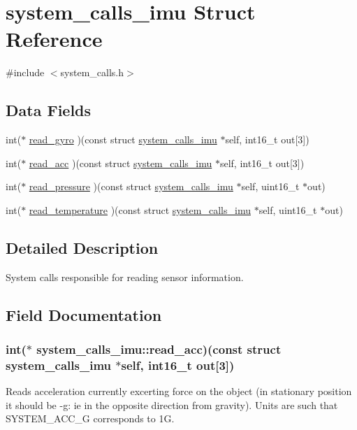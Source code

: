 \hypertarget{structsystem__calls__imu}{\section{system\+\_\+calls\+\_\+imu Struct Reference}
\label{structsystem__calls__imu}
}


{\ttfamily \#include $<$system\+\_\+calls.\+h$>$}

\subsection*{Data Fields}
\begin{DoxyCompactItemize}
\item 
int($\ast$ \hyperlink{structsystem__calls__imu_ab1f03b777e691071d7e4a3457ddf2bc9}{read\+\_\+gyro} )(const struct \hyperlink{structsystem__calls__imu}{system\+\_\+calls\+\_\+imu} $\ast$self, int16\+\_\+t out\mbox{[}3\mbox{]})
\item 
int($\ast$ \hyperlink{structsystem__calls__imu_a7332940e9cafed8accb6a8d58a1ae2b6}{read\+\_\+acc} )(const struct \hyperlink{structsystem__calls__imu}{system\+\_\+calls\+\_\+imu} $\ast$self, int16\+\_\+t out\mbox{[}3\mbox{]})
\item 
int($\ast$ \hyperlink{structsystem__calls__imu_a3c4156ffcb688f20f98f289c7340ae3d}{read\+\_\+pressure} )(const struct \hyperlink{structsystem__calls__imu}{system\+\_\+calls\+\_\+imu} $\ast$self, uint16\+\_\+t $\ast$out)
\item 
int($\ast$ \hyperlink{structsystem__calls__imu_a0d4dff52f5fc7c1af893a1b166470b5d}{read\+\_\+temperature} )(const struct \hyperlink{structsystem__calls__imu}{system\+\_\+calls\+\_\+imu} $\ast$self, uint16\+\_\+t $\ast$out)
\end{DoxyCompactItemize}


\subsection{Detailed Description}
System calls responsible for reading sensor information. 

\subsection{Field Documentation}
\hypertarget{structsystem__calls__imu_a7332940e9cafed8accb6a8d58a1ae2b6}{
\subsubsection[{read\+\_\+acc}]{\setlength{\rightskip}{0pt plus 5cm}int($\ast$ system\+\_\+calls\+\_\+imu\+::read\+\_\+acc)(const struct {\bf system\+\_\+calls\+\_\+imu} $\ast$self, int16\+\_\+t out\mbox{[}3\mbox{]})}}\label{structsystem__calls__imu_a7332940e9cafed8accb6a8d58a1ae2b6}
Reads acceleration currently excerting force on the object (in stationary position it should be -\/g\+: ie in the opposite direction from gravity). Units are such that S\+Y\+S\+T\+E\+M\+\_\+\+A\+C\+C\+\_\+G corresponds to 1\+G.


